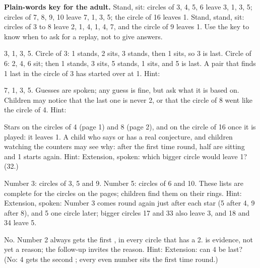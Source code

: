 \textbf{Plain-words key for the adult.} Stand, sit: circles of 3, 4, 5, 6 leave 3, 1, 3, 5; circles of 7, 8, 9, 10 leave 7, 1, 3, 5; the circle of 16 leaves 1. Stand, stand, sit: circles of 3 to 8 leave 2, 1, 4, 1, 4, 7, and the circle of 9 leaves 1. Use the key to know when to ask for a replay, not to give answers.

3, 1, 3, 5. Circle of 3: 1 stands, 2 sits, 3 stands, then 1 sits, so 3 is last. Circle of 6: 2, 4, 6 sit; then 1 stands, 3 sits, 5 stands, 1 sits, and 5 is last. A pair that finds 1 last in the circle of 3 has started over at 1. Hint: 

7, 1, 3, 5. Guesses are spoken; any guess is fine, but ask what it is based on. Children may notice that the last one is never 2, or that the circle of 8 went like the circle of 4. Hint: 

Stars on the circles of 4 (page 1) and 8 (page 2), and on the circle of 16 once it is played: it leaves 1. A child who says  or  has a real conjecture, and children watching the counters may see why: after the first time round, half are sitting and 1 starts again. Hint:  Extension, spoken: which bigger circle would leave 1? (32.)

Number 3: circles of 3, 5 and 9. Number 5: circles of 6 and 10. These lists are complete for the circles on the pages; children find them on their rings. Hint:  Extension, spoken:  Number 3 comes round again just after each star (5 after 4, 9 after 8), and 5 one circle later; bigger circles 17 and 33 also leave 3, and 18 and 34 leave 5.

No. Number 2 always gets the first , in every circle that has a 2.  is evidence, not yet a reason; the follow-up  invites the reason. Hint:  Extension: can 4 be last? (No: 4 gets the second ; every even number sits the first time round.)

